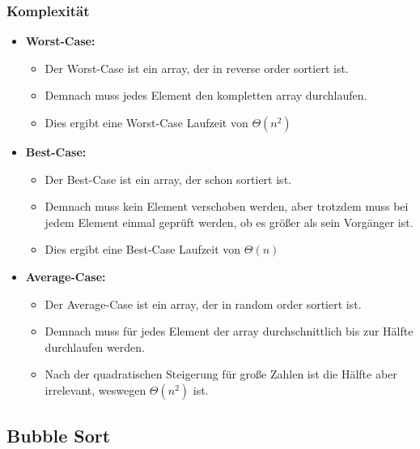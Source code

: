 \documentclass[
../../AuD-Zusammenfassung.tex,
]
{subfiles}
\begin{document}
\subsubsection{Komplexität}
\begin{itemize}
    \item \textbf{Worst-Case:}
    \begin{itemize}
        \item Der Worst-Case ist ein array, der in reverse order sortiert ist. 
        \item Demnach muss jedes Element den kompletten array durchlaufen.
        \item Dies ergibt eine Worst-Case Laufzeit von $\Theta(n^2)$
    \end{itemize}
    \item \textbf{Best-Case:}
    \begin{itemize}
        \item Der Best-Case ist ein array, der schon sortiert ist.
        \item Demnach muss kein Element verschoben werden, aber trotzdem muss bei jedem Element einmal geprüft werden, ob es größer als sein Vorgänger ist.
        \item Dies ergibt eine Best-Case Laufzeit von $\Theta(n)$
    \end{itemize}
    \item \textbf{Average-Case:}
    \begin{itemize}
        \item Der Average-Case ist ein array, der in random order sortiert ist.
        \item Demnach muss für jedes Element der array durchschnittlich bis zur Hälfte durchlaufen werden.
        \item Nach der quadratischen Steigerung für große Zahlen ist die Hälfte aber irrelevant, weswegen $\Theta(n^2)$ ist.
    \end{itemize}
\end{itemize}
\newpage

\subsection{Bubble Sort}

\end{document}
